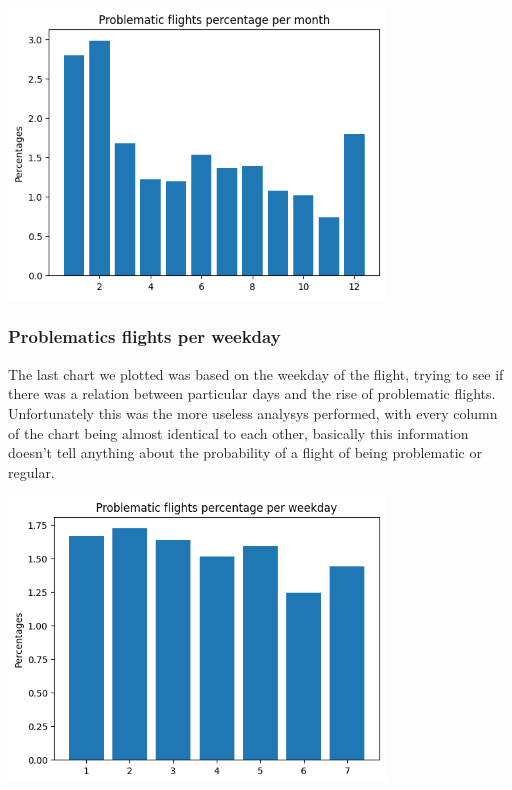 \documentclass[
	letterpaper, %
	10pt, %
]{class}
\begin{document}
\begin{center}
    \includegraphics[width=10cm]{../images/problematics_per_month.png}
\end{center}

\subsubsection{Problematics flights per weekday}

The last chart we plotted was based on the weekday of the flight, trying to see if there was a relation between particular days and the rise of problematic flights.\\

Unfortunately this was the more useless analysys performed, with every column of the chart being almost identical to each other, basically this information doesn't tell anything about the probability of a flight of being problematic or regular.

\begin{center}
    \includegraphics[width=10cm]{../images/problematics_per_weekday.png}
\end{center}
\end{document}
